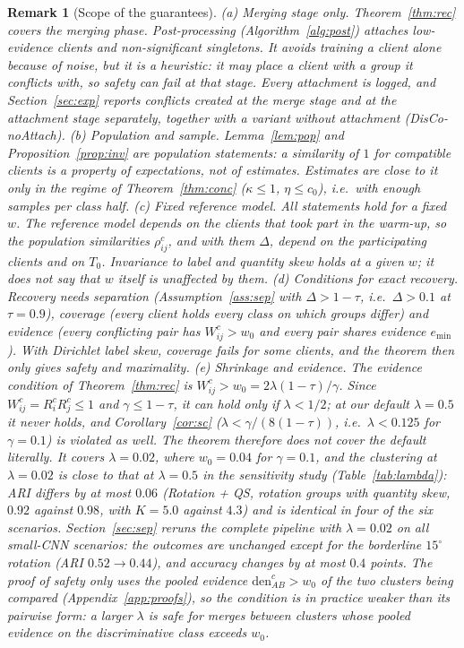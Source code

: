 \documentclass[pdflatex,sn-apa]{sn-jnl}
\theoremstyle{thmstyleone}
\theoremstyle{thmstylethree}
\newtheorem{remark}{Remark}
\begin{document}
\begin{remark}[Scope of the guarantees]\label{rem:scope}
(a) \emph{Merging stage only.} Theorem~\ref{thm:rec} covers the merging phase. Post-processing (Algorithm~\ref{alg:post}) attaches low-evidence clients and non-significant singletons. It avoids training a client alone because of noise, but it is a heuristic: it may place a client with a group it conflicts with, so safety can fail at that stage. Every attachment is logged, and Section~\ref{sec:exp} reports conflicts created at the merge stage and at the attachment stage separately, together with a variant without attachment (DisCo-noAttach).
(b) \emph{Population and sample.} Lemma~\ref{lem:pop} and Proposition~\ref{prop:inv} are population statements: a similarity of $1$ for compatible clients is a property of expectations, not of estimates. Estimates are close to it only in the regime of Theorem~\ref{thm:conc} ($\kappa\le1$, $\eta\le c_0$), i.e.\ with enough samples per class half.
(c) \emph{Fixed reference model.} All statements hold for a fixed $w$. The reference model depends on the clients that took part in the warm-up, so the population similarities $\rho^c_{ij}$, and with them $\Delta$, depend on the participating clients and on $T_0$. Invariance to label and quantity skew holds at a given $w$; it does not say that $w$ itself is unaffected by them.
(d) \emph{Conditions for exact recovery.} Recovery needs separation (Assumption~\ref{ass:sep} with $\Delta>1-\tau$, i.e.\ $\Delta>0.1$ at $\tau=0.9$), coverage (every client holds every class on which groups differ) and evidence (every conflicting pair has $W^c_{ij}>w_0$ and every pair shares evidence $e_{\min}$). With Dirichlet label skew, coverage fails for some clients, and the theorem then only gives safety and maximality.
(e) \emph{Shrinkage and evidence.} The evidence condition of Theorem~\ref{thm:rec} is $W^c_{ij}>w_0=2\lambda(1-\tau)/\gamma$. Since $W^c_{ij}=R_i^cR_j^c\le1$ and $\gamma\le1-\tau$, it can hold only if $\lambda<1/2$; at our default $\lambda=0.5$ it never holds, and Corollary~\ref{cor:sc} ($\lambda<\gamma/(8(1-\tau))$, i.e.\ $\lambda<0.125$ for $\gamma=0.1$) is violated as well. The theorem therefore does not cover the default literally. It covers $\lambda=0.02$, where $w_0=0.04$ for $\gamma=0.1$, and the clustering at $\lambda=0.02$ is close to that at $\lambda=0.5$ in the sensitivity study (Table~\ref{tab:lambda}): ARI differs by at most $0.06$ (\emph{Rotation + QS}, rotation groups with quantity skew, $0.92$ against $0.98$, with $K=5.0$ against $4.3$) and is identical in four of the six scenarios. Section~\ref{sec:sep} reruns the complete pipeline with $\lambda=0.02$ on all small-CNN scenarios: the outcomes are unchanged except for the borderline $15^\circ$ rotation (ARI $0.52\to0.44$), and accuracy changes by at most $0.4$ points. The proof of safety only uses the pooled evidence $\mathrm{den}^c_{AB}>w_0$ of the two clusters being compared (Appendix~\ref{app:proofs}), so the condition is in practice weaker than its pairwise form: a larger $\lambda$ is safe for merges between clusters whose pooled evidence on the discriminative class exceeds $w_0$.

\end{remark}
\end{document}
